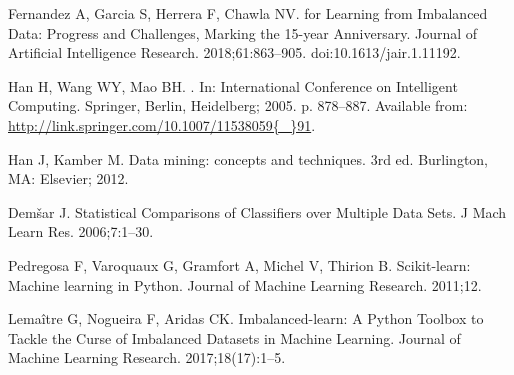 \documentclass[10pt,letterpaper]{article}
\begin{document}
\begin{thebibliography}{10}
  Fernandez A, Garcia S, Herrera F, Chawla NV.
   for Learning from Imbalanced Data: Progress and Challenges,
    Marking the 15-year Anniversary.
  \newblock Journal of Artificial Intelligence Research. 2018;61:863--905.
  \newblock doi:{10.1613/jair.1.11192}.
  
  Han H, Wang WY, Mao BH.
  .
  \newblock In: International Conference on Intelligent Computing. Springer,
    Berlin, Heidelberg; 2005. p. 878--887.
  \newblock Available from:
    \url{http://link.springer.com/10.1007/11538059{\_}91}.
  
  Han J, Kamber M.
  \newblock Data mining: concepts and techniques.
  \newblock 3rd ed. Burlington, MA: Elsevier; 2012.
  
  Dem\v{s}ar J.
  \newblock Statistical Comparisons of Classifiers over Multiple Data Sets.
  \newblock J Mach Learn Res. 2006;7:1--30.
  
  Pedregosa F, Varoquaux G, Gramfort A, Michel V, Thirion B.
  \newblock Scikit-learn: Machine learning in Python.
  \newblock Journal of Machine Learning Research. 2011;12.
  
  Lema{{\^i}}tre G, Nogueira F, Aridas CK.
  \newblock Imbalanced-learn: A Python Toolbox to Tackle the Curse of Imbalanced
    Datasets in Machine Learning.
  \newblock Journal of Machine Learning Research. 2017;18(17):1--5.
  
  \end{thebibliography}
\end{document}
